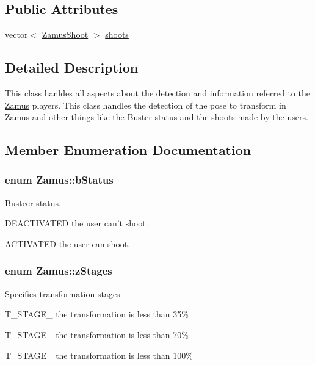 \subsection*{Public Attributes}
\begin{DoxyCompactItemize}
\item 
vector$<$ \hyperlink{classZamusShoot}{ZamusShoot} $>$ \hyperlink{classZamus_a8b8f7d06c64a6571521a82ef7b856189}{shoots}
\end{DoxyCompactItemize}


\subsection{Detailed Description}
This class hanldes all aspects about the detection and information referred to the \hyperlink{classZamus}{Zamus} players. This class handles the detection of the pose to transform in \hyperlink{classZamus}{Zamus} and other things like the Buster status and the shoots made by the users. 

\subsection{Member Enumeration Documentation}
\hypertarget{classZamus_a526a54006da10b674ba8f8f6f2e1babc}{
\subsubsection[{bStatus}]{\setlength{\rightskip}{0pt plus 5cm}enum {\bf Zamus::bStatus}}}
\label{classZamus_a526a54006da10b674ba8f8f6f2e1babc}
Busteer status.


\begin{DoxyItemize}
\item DEACTIVATED the user can't shoot.
\item ACTIVATED the user can shoot. 
\end{DoxyItemize}\hypertarget{classZamus_a96d3e36d702b18721c5a600374b719d4}{
\subsubsection[{zStages}]{\setlength{\rightskip}{0pt plus 5cm}enum {\bf Zamus::zStages}}}
\label{classZamus_a96d3e36d702b18721c5a600374b719d4}
Specifies transformation stages.


\begin{DoxyItemize}
\item T\_\-STAGE\_ the transformation is less than 35\%
\item T\_\-STAGE\_ the transformation is less than 70\%
\item T\_\-STAGE\_ the transformation is less than 100\% 
\end{DoxyItemize}


